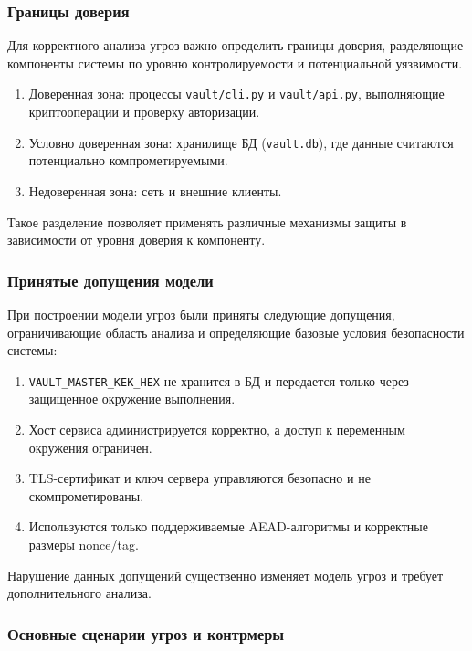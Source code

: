 \documentclass[14pt, a4paper]{extarticle}
\begin{document}
	\subsubsection{Границы доверия}
	
	Для корректного анализа угроз важно определить границы доверия, разделяющие компоненты системы по уровню контролируемости и потенциальной уязвимости.
	
	\begin{enumerate}
	\item Доверенная зона: процессы \texttt{vault/cli.py} и \texttt{vault/api.py}, выполняющие криптооперации и проверку авторизации.
	\item Условно доверенная зона: хранилище БД (\texttt{vault.db}), где данные считаются потенциально компрометируемыми.
	\item Недоверенная зона: сеть и внешние клиенты.
	\end{enumerate}
	
	Такое разделение позволяет применять различные механизмы защиты в зависимости от уровня доверия к компоненту.
		
	\subsubsection{Принятые допущения модели}
	
	При построении модели угроз были приняты следующие допущения, ограничивающие область анализа и определяющие базовые условия безопасности системы:
	
	\begin{enumerate}
	\item \texttt{VAULT\_MASTER\_KEK\_HEX} не хранится в БД и передается только через защищенное окружение выполнения.
	\item Хост сервиса администрируется корректно, а доступ к переменным окружения ограничен.
	\item TLS-сертификат и ключ сервера управляются безопасно и не скомпрометированы.
	\item Используются только поддерживаемые AEAD-алгоритмы и корректные размеры nonce/tag.
	\end{enumerate}
	
	Нарушение данных допущений существенно изменяет модель угроз и требует дополнительного анализа.
		
	\subsubsection{Основные сценарии угроз и контрмеры}
	
\end{document}
